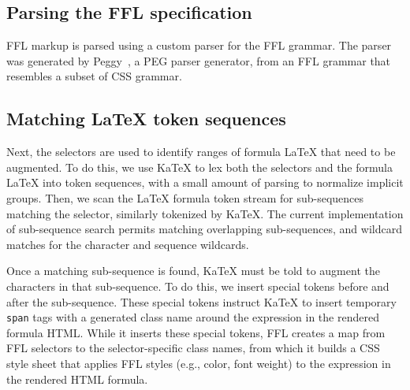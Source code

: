 \subsection{Parsing the FFL specification}
FFL markup is parsed using a custom parser for the FFL grammar. The parser was generated by Peggy~\cite{Peggy}, a PEG parser generator, from an FFL grammar that resembles a subset of CSS grammar.

\subsection{Matching LaTeX token sequences}
Next, the selectors are used to identify ranges of formula LaTeX that need to be augmented. To do this, we use KaTeX to lex both the selectors and the formula LaTeX into token sequences, with a small amount of parsing to normalize implicit groups. Then, we scan the LaTeX formula token stream for sub-sequences matching the selector, similarly tokenized by KaTeX.  The current implementation of sub-sequence search permits matching overlapping sub-sequences, and wildcard matches for the character and sequence wildcards.

Once a matching sub-sequence is found, KaTeX must be told to augment the characters in that sub-sequence. To do this, we insert special tokens before and after the sub-sequence. These special tokens instruct KaTeX to insert temporary \texttt{span} tags with a generated class name around the expression in the rendered formula HTML. While it inserts these special tokens, FFL creates a map from FFL selectors to the selector-specific class names, from which it builds a CSS style sheet that applies FFL styles (e.g., color, font weight) to the expression in the rendered HTML formula.


